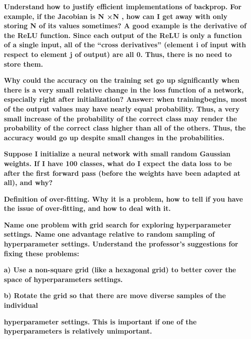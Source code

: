 \documentclass[10pt,letterpaper]{article}
\begin{document}
\subitem \textbf{ Understand how to justify efficient implementations of backprop. For example, if the Jacobian is N ×N , how can I get away with only storing N of its values sometimes? A good example is the derivative of the ReLU function. Since each output of the ReLU is only a function of a single input, all of the “cross derivatives” (element i of input with respect to element j of output) are all 0. Thus, there is no need to store them.}
\begin{solution}
\end{solution}
\subitem \textbf{ Why could the accuracy on the training set go up significantly when there is a very small relative change in the loss function of a network, especially right after initialization? Answer: when trainingbegins, most of the output values may have nearly equal probability. Thus, a very small increase of the probability of the correct class may render the probability of the correct class higher than all of the others. Thus, the accuracy would go up despite small changes in the probabilities.}
\begin{solution}
\end{solution}
\subitem \textbf{ Suppose I initialize a neural network with small random Gaussian weights. If I have 100 classes, what do I expect the data loss to be after the first forward pass (before the weights have been adapted at all), and why?}
\begin{solution}
\end{solution}
\subitem \textbf{ Definition of over-fitting. Why it is a problem, how to tell if you have the issue of over-fitting, and how to deal with it.}
\begin{solution}
\end{solution}
\subitem \textbf{ Name one problem with grid search for exploring hyperparameter settings. Name one advantage relative to random sampling of hyperparameter settings. Understand the professor’s suggestions for fixing these problems: }
\begin{solution}
\end{solution}
\subsubitem \textbf{ a) Use a non-square grid (like a hexagonal grid) to better cover the space of hyperparameters settings. }
\begin{solution}
\end{solution}
\subsubitem \textbf{ b) Rotate the grid so that there are move diverse samples of the individual}
\begin{solution}
\end{solution}
\subsubitem \textbf{ hyperparameter settings. This is important if one of the hyperparameters is relatively unimportant.}
\end{document}
